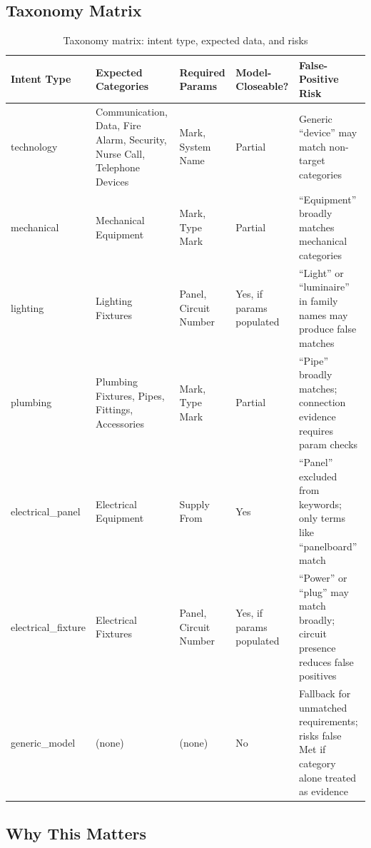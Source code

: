 \documentclass[10pt,letterpaper]{article}
\begin{document}
\subsection{Taxonomy Matrix}

\begin{longtable}{p{1.1in}p{1.2in}p{1.2in}p{0.9in}p{1.3in}}
\caption{Taxonomy matrix: intent type, expected data, and risks}
\label{tab:taxonomy}\\
\toprule
\textbf{Intent Type} & \textbf{Expected Categories} & \textbf{Required Params} & \textbf{Model-Closeable?} & \textbf{False-Positive Risk} \\
\midrule
\endhead
technology & Communication, Data, Fire Alarm, Security, Nurse Call, Telephone Devices & Mark,
  System Name & Partial & Generic ``device'' may match non-target categories \\
mechanical & Mechanical Equipment & Mark, Type Mark & Partial & ``Equipment'' broadly matches
  mechanical categories \\
lighting & Lighting Fixtures & Panel, Circuit Number & Yes, if params populated
  & ``Light'' or ``luminaire'' in family names may produce false matches \\
plumbing & Plumbing Fixtures, Pipes, Fittings, Accessories & Mark, Type Mark & Partial
  & ``Pipe'' broadly matches; connection evidence requires param checks \\
electrical\_panel & Electrical Equipment & Supply From & Yes
  & ``Panel'' excluded from keywords; only terms like ``panelboard'' match \\
electrical\_fixture & Electrical Fixtures & Panel, Circuit Number & Yes, if params populated
  & ``Power'' or ``plug'' may match broadly; circuit presence reduces false positives \\
generic\_model & (none) & (none) & No & Fallback for unmatched requirements; risks false Met if
  category alone treated as evidence \\
\bottomrule
\end{longtable}

\subsection{Why This Matters}
\end{document}
